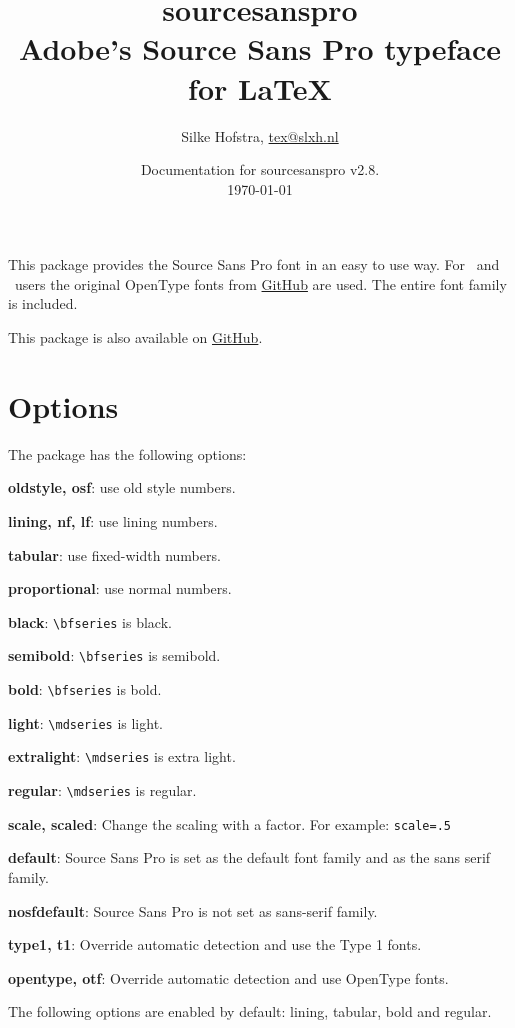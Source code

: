 \documentclass[10pt,a4paper,english]{article}
\title{\bfseries
	\Huge sourcesanspro\\
	\Large Adobe's Source Sans Pro typeface for \LaTeX
}
\author{Silke Hofstra, \href{mailto:tex@slxh.nl}{tex@slxh.nl}}
\date{Documentation for sourcesanspro v2.8.\\ \today}
\begin{document}
\maketitle
\begin{multicols}{2}
This package provides the Source Sans Pro font in an easy to use way. For \XeLaTeX\ and \LuaLaTeX\ users the original OpenType fonts from \href{https://github.com/adobe-fonts/source-sans-pro}{GitHub} are used. The entire font family is included.

This package is also available on \href{https://github.com/silkeh/latex-sourcesanspro}{GitHub}.


\section{Options}
The package has the following options:
\begin{itemize*}
	\item \textbf{oldstyle, osf}:  use old style numbers.
	\item \textbf{lining, nf, lf}: use lining numbers.
	\item \textbf{tabular}:        use fixed-width numbers.
	\item \textbf{proportional}:   use normal numbers.
	\item \textbf{black}:          \texttt{\textbackslash bfseries} is black.
	\item \textbf{semibold}:       \texttt{\textbackslash bfseries} is semibold.
	\item \textbf{bold}:           \texttt{\textbackslash bfseries} is bold.
	\item \textbf{light}:          \texttt{\textbackslash mdseries} is light.
	\item \textbf{extralight}:     \texttt{\textbackslash mdseries} is extra light.
	\item \textbf{regular}:        \texttt{\textbackslash mdseries} is regular.
	\item \textbf{scale, scaled}:  Change the scaling with a factor. For example:  \texttt{scale=.5}
	\item \textbf{default}:        Source Sans Pro is set as the default font family and as the sans serif family.
	\item \textbf{nosfdefault}:    Source Sans Pro is not set as sans-serif family.
	\item \textbf{type1, t1}:      Override automatic detection and use the Type 1 fonts.
	\item \textbf{opentype, otf}:  Override automatic detection and use OpenType fonts.
\end{itemize*}
The following options are enabled by default: lining, tabular, bold and regular.


\end{multicols}
\end{document}
